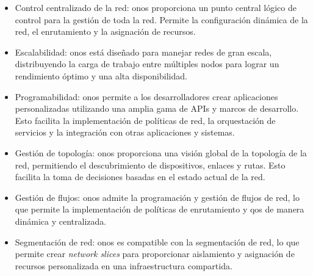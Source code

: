 \begin{itemize}
    \item  Control centralizado de la red: \gls{onos} proporciona un punto central lógico de control  para la gestión de toda la red. Permite la configuración dinámica de la red, el enrutamiento y la asignación de recursos.
    \item Escalabilidad: \gls{onos} está diseñado para manejar redes de gran escala, distribuyendo la carga de trabajo entre múltiples nodos para lograr un rendimiento óptimo y una alta disponibilidad.
    \item Programabilidad: \gls{onos} permite a los desarrolladores crear aplicaciones personalizadas utilizando una amplia gama de APIs y marcos de desarrollo. Esto facilita la implementación de políticas de red, la orquestación de servicios y la integración con otras aplicaciones y sistemas.
    \item Gestión de topología: \gls{onos} proporciona una visión global de la topología de la red, permitiendo el descubrimiento de dispositivos, enlaces y rutas. Esto facilita la toma de decisiones basadas en el estado actual de la red.
    \item Gestión de flujos: \gls{onos} admite la programación y gestión de flujos de red, lo que permite la implementación de políticas de enrutamiento y \gls{qos} de manera dinámica y centralizada.
    \item Segmentación de red: \gls{onos} es compatible con la segmentación de red, lo que permite crear \textit{network slices} para proporcionar aislamiento y asignación de recursos personalizada en una infraestructura compartida.
\end{itemize}

